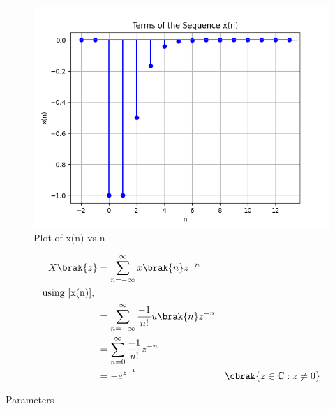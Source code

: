 \documentclass[journal,12pt,twocolumn]{IEEEtran}
\begin{document}
\begin{figure}[h]
   \centering
   \includegraphics[width=1\columnwidth]{ncert-maths/11/9/1/12/figs/plot.png}
   \caption{Plot of x(n) vs n}
   \label{fig: 9.1.12.1}
\end{figure}

\begin{align}
    X \brak{z} & = \sum_{n=-\infty}^{\infty} x \brak{n}   z^{-n} \\
    \notag \text{using \eqref{x(n)}, } \\
    & = \sum_{n=-\infty}^{\infty} \frac{-1}{n!}  u \brak{n}   z^{-n} \\
    & = \sum_{n=0}^{\infty} \frac{-1}{n!}   z^{-n} \\
    & = - e^{z^{-1}} &  \cbrak{z\in\mathbb{C} : z \neq 0} 
\end{align}

\begin{table}[h]
    \centering
    
    \caption{Parameters}
    \label{tab: 9.1.12.1}
\end{table}


\end{document}
